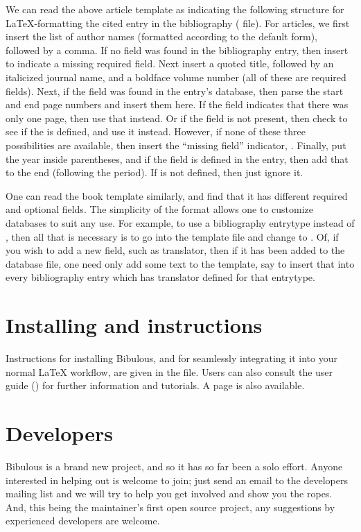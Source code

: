 \documentclass[letterpaper,10pt,english]{sphinxmanual}
\begin{document}
We can read the above article template as indicating the following structure for LaTeX-formatting the cited entry in the bibliography ( file). For articles, we first insert the list of author names (formatted according to the default form), followed by a comma. If no  field was found in the bibliography entry, then insert  to indicate a missing required field. Next insert a quoted title, followed by an italicized journal name, and a boldface volume number (all of these are required fields). Next, if the  field was found in the entry's database, then parse the start and end page numbers and insert them here. If the  field indicates that there was only one page, then use that instead. Or if the  field is not present, then check to see if the  is defined, and use it instead. However, if none of these three possibilities are available, then insert the “missing field” indicator, . Finally, put the year inside parentheses, and if the  field is defined in the entry, then add that to the end (following the period). If  is not defined, then just ignore it.

One can read the book template similarly, and find that it has different required and optional fields. The simplicity of the format allows one to customize databases to suit any use. For example, to use a bibliography entrytype  instead of , then all that is necessary is to go into the template file and change  to . Of, if you wish to add a new field, such as translator, then if it has been added to the  database file, one need only add some text to the template, say  to insert that into every bibliography entry which has translator defined for that entrytype.


\section{Installing and instructions}
\label{index:installing-and-instructions}
Instructions for installing Bibulous, and for seamlessly integrating it into your normal LaTeX workflow, are given in the  file. Users can also consult the user guide () for further information and tutorials. A  page is also available.


\section{Developers}
\label{index:developers}
Bibulous is a brand new project, and so it has so far been a solo effort. Anyone interested in helping out is welcome to join; just send an email to the developers mailing list and we will try to help you get involved and show you the ropes. And, this being the maintainer's first open source project, any suggestions by experienced developers are welcome.
\end{document}
